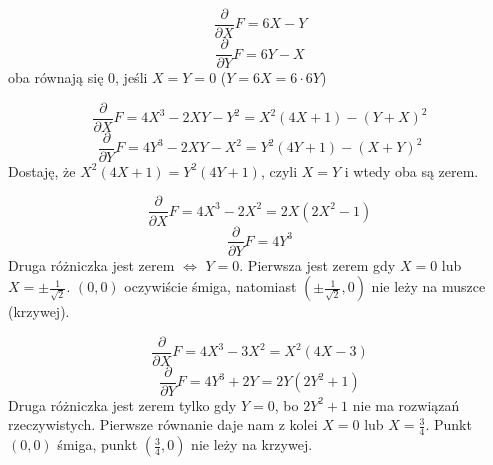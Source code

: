 \documentclass{article}
\begin{document}
{\color{orange!60!black}
  $$\frac{\partial}{\partial X}F=6X-Y$$
  $$\frac{\partial}{\partial Y}F=6Y-X$$
  oba równają się $0$, jeśli $X=Y=0$ ($Y=6X=6\cdot 6Y$)
}

{\color{green!60!black}
  $$\frac{\partial}{\partial X}F=4X^3-2XY-Y^2=X^2(4X+1)-(Y+X)^2$$
  $$\frac{\partial}{\partial Y}F=4Y^3-2XY-X^2=Y^2(4Y+1)-(X+Y)^2$$
  Dostaję, że $X^2(4X+1)=Y^2(4Y+1)$, czyli $X=Y$ i wtedy oba są zerem.
}

{\color{red!60!black}
  $$\frac{\partial}{\partial X}F=4X^3-2X^2=2X(2X^2-1)$$
  $$\frac{\partial}{\partial Y}F=4Y^3$$
  Druga różniczka jest zerem $\iff$ $Y=0$. Pierwsza jest zerem gdy $X=0$ lub $X=\pm \frac{1}{\sqrt{2}}$. $(0,0)$ oczywiście śmiga, natomiast $(\pm\frac{1}{\sqrt2},0)$ nie leży na muszce (krzywej).
}

{\color{blue!60!black}
  $$\frac{\partial}{\partial X}F=4X^3-3X^2=X^2(4X-3)$$
  $$\frac{\partial}{\partial Y}F=4Y^3+2Y=2Y(2Y^2+1)$$
  Druga różniczka jest zerem tylko gdy $Y=0$, bo $2Y^2+1$ nie ma rozwiązań rzeczywistych. Pierwsze równanie daje nam z kolei $X=0$ lub $X=\frac{3}{4}$. Punkt $(0,0)$ śmiga, punkt $(\frac{3}{4}, 0)$ nie leży na krzywej.
}
\end{document}
